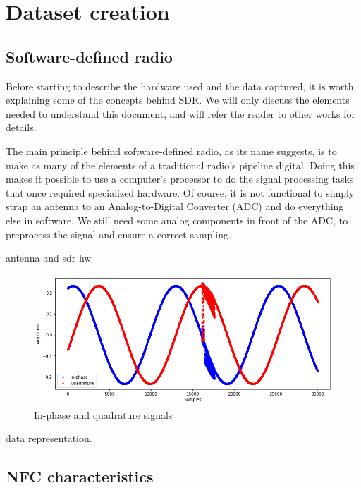 \section{Dataset creation}

\subsection{Software-defined radio}

Before starting to describe the hardware used and the data captured, it is worth explaining some of the concepts behind SDR. We will only discuss the elements needed to understand this document, and will refer the reader to other works for details.

The main principle behind software-defined radio, as its name suggests, is to make as many of the elements of a traditional radio's pipeline digital. Doing this makes it possible to use a computer's processor to do the signal processing tasks that once required specialized hardware. Of course, it is not functional to simply strap an antenna to an Analog-to-Digital Converter (ADC) and do everything else in software. We still need some analog components in front of the ADC, to preprocess the signal and ensure a correct sampling. \cite{wiki_software-defined_2020, hackaday_your_2015, spiess_286_2019}

antenna and sdr hw

\begin{figure}[htp!]
  \centering
  \includegraphics[scale=0.6]{figures/data_IQ-signal.png}
  \caption{In-phase and quadrature signals}
  \label{fig:iq-signal}
\end{figure}

data representation.

\subsection{NFC characteristics}


